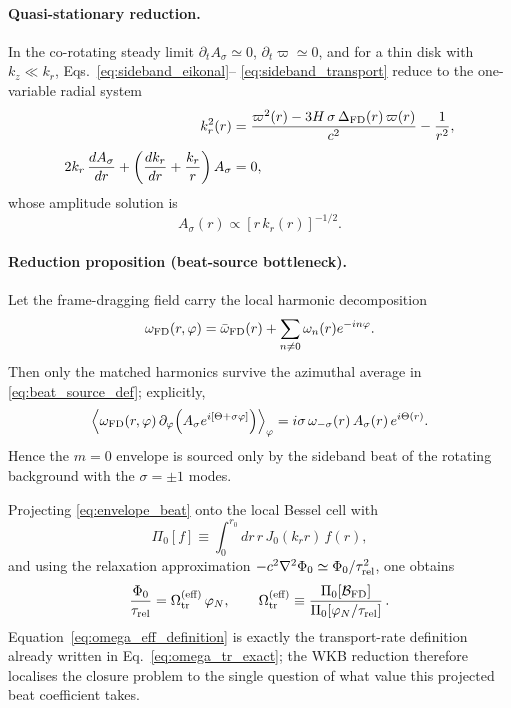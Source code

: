 \documentclass[11pt]{article}
\begin{document}
\paragraph{Quasi-stationary reduction.}
In the co-rotating steady limit
$\partial_t A_\sigma\simeq0$, $\partial_t\varpi\simeq0$, and for a thin
disk with $k_z\ll k_r$, Eqs.~\eqref{eq:sideband_eikonal}--
\eqref{eq:sideband_transport} reduce to the one-variable radial system
\begin{align}
k_r^2(r)
&=
\frac{\varpi^2(r)-3H\,\sigma\,\Delta_{\rm FD}(r)\,\varpi(r)}{c^2}
- \frac{1}{r^2},
\label{eq:kr_steady}
\\[4pt]
2k_r\,\frac{dA_\sigma}{dr}
+ \left(\frac{dk_r}{dr}+\frac{k_r}{r}\right)A_\sigma
&= 0,
\label{eq:steady_amp_ode}
\end{align}
whose amplitude solution is
\begin{equation}
A_\sigma(r)\propto [r\,k_r(r)]^{-1/2}.
\label{eq:steady_amp_solution}
\end{equation}
\paragraph{Reduction proposition (beat-source bottleneck).}
Let the frame-dragging field carry the local harmonic decomposition
\begin{equation}
\omega_{\rm FD}(r,\phi)
= \bar\omega_{\rm FD}(r)
+ \sum_{n\neq 0}\omega_n(r)e^{-in\phi}.
\label{eq:omega_fd_harmonics}
\end{equation}
Then only the matched harmonics survive the azimuthal average in
\eqref{eq:beat_source_def}; explicitly,
\begin{equation}
\left\langle
\omega_{\rm FD}(r,\phi)\,
\partial_\phi\!\left(A_\sigma e^{i[\Theta+\sigma\phi]}\right)
\right\rangle_\phi
= i\sigma\,\omega_{-\sigma}(r)\,A_\sigma(r)\,e^{i\Theta(r)}.
\label{eq:matched_harmonic}
\end{equation}
Hence the $m=0$ envelope is sourced only by the sideband beat of the
rotating background with the $\sigma=\pm1$ modes.

Projecting \eqref{eq:envelope_beat} onto the local Bessel cell with
\begin{equation}
\Pi_0[f]
\equiv
\int_0^{r_0}\!dr\,r\,J_0(k_r r)\,f(r),
\label{eq:bessel_projector}
\end{equation}
and using the relaxation approximation
$-c^2\nabla^2\Phi_0 \simeq \Phi_0/\tau_{\rm rel}^2$, one obtains
\begin{equation}
\frac{\Phi_0}{\tau_{\rm rel}}
= \Omega_{\rm tr}^{\rm (eff)}\,\varphi_N,
\qquad
\Omega_{\rm tr}^{\rm (eff)}
\equiv
\frac{\Pi_0[\mathcal{B}_{\rm FD}]}{\Pi_0[\varphi_N/\tau_{\rm rel}]}\,.
\label{eq:omega_eff_definition}
\end{equation}
Equation~\eqref{eq:omega_eff_definition} is exactly the transport-rate
definition already written in Eq.~\eqref{eq:omega_tr_exact}; the WKB
reduction therefore localises the closure problem to the single question
of what value this projected beat coefficient takes.
\end{document}
